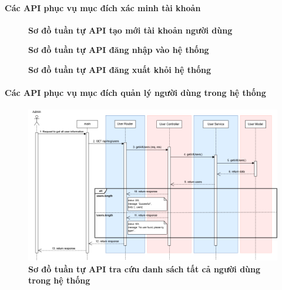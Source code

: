 \paragraph{Các API phục vụ mục đích xác minh tài khoản}
\mbox{}

\begin{figure}[H]
	\centering
	\caption[Sơ đồ tuần tự API tạo mới tài khoản người dùng]{\bfseries \fontsize{12pt}{0pt}\selectfont Sơ đồ tuần tự API tạo mới tài khoản người dùng}
	\label{sequence_diagram_create_account}
\end{figure}

\begin{figure}[H]
	\centering
	\caption[Sơ đồ tuần tự API đăng nhập vào hệ thống]{\bfseries \fontsize{12pt}{0pt}\selectfont Sơ đồ tuần tự API đăng nhập vào hệ thống}
	\label{sequence_diagram_login}
\end{figure}

\begin{figure}[H]
	\centering
	\caption[Sơ đồ tuần tự API đăng xuất khỏi hệ thống]{\bfseries \fontsize{12pt}{0pt}\selectfont Sơ đồ tuần tự API đăng xuất khỏi hệ thống}
	\label{sequence_diagram_logout}
\end{figure}

\paragraph{Các API phục vụ mục đích quản lý người dùng trong hệ thống}
\mbox{}
\begin{figure}[H]
	\centering
	\includegraphics[width=16cm]{Images/api_sequence/user/getAllUsers.drawio.png}
	\caption[Sơ đồ tuần tự API tra cứu danh sách tất cả người dùng trong hệ thống]{\bfseries \fontsize{12pt}{0pt}\selectfont Sơ đồ tuần tự API tra cứu danh sách tất cả người dùng trong hệ thống}
	\label{sequence_diagram_get_all_users}
\end{figure}

